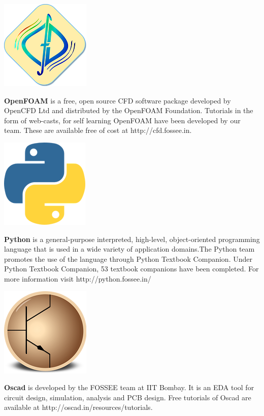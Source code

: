 \documentclass{letter}
\begin{document}
\begin{minipage}[t]{0.48\linewidth} \begin{center}
\includegraphics[width=0.32\linewidth]{images/cfd_logo.png} \end{center}
\textbf{OpenFOAM} is a free, open source CFD software package developed by
OpenCFD Ltd and distributed by the OpenFOAM Foundation. Tutorials in the form
of web-casts, for self learning OpenFOAM have been developed by our team. These
are available free of cost at {\color{blue}http://cfd.fossee.in}.  \end{minipage}
\hspace{0.04\linewidth}
\begin{minipage}[t]{0.48\linewidth} \begin{center}
\includegraphics[width=0.32\linewidth]{images/python_logo.png} \end{center}
\textbf{Python} is a general-purpose interpreted, high-level, object-oriented
programming language that is used in a wide variety of application domains.The
Python team promotes the use of the language through Python Textbook Companion.
Under Python Textbook Companion, 53 textbook companions have been completed.
For more information visit {\color{blue}http://python.fossee.in/} \end{minipage}

\begin{minipage}[t]{0.48\linewidth} \begin{center}
\includegraphics[width=0.32\linewidth]{images/oscad_logo.png} \end{center}
\textbf{Oscad} is developed by the FOSSEE team at IIT Bombay. It is an EDA tool
for circuit design, simulation, analysis and PCB design. Free tutorials of
Oscad are available at {\color{blue}http://oscad.in/resources/tutorials}.  \end{minipage}
\end{document}
